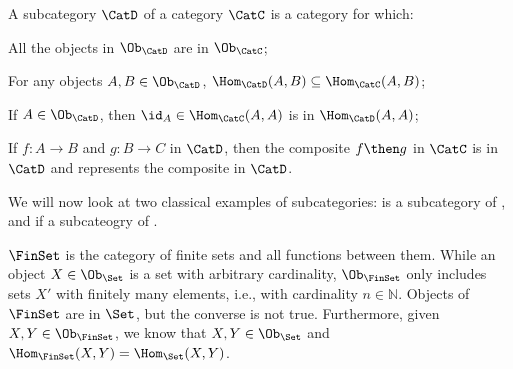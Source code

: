 \begin{ctdefinition}[Subcategory]
\label{def:subcategory}
A subcategory $\CatD$ of a category $\CatC$ is a category for which:
\begin{compactenum}
    \item All the objects in $\Ob_\CatD$ are in $\Ob_\CatC$;
    \item For any objects $A,B\in \Ob_\CatD$, $\Hom_\CatD(A,B)\subseteq \Hom_\CatC(A,B)$;
    \item If $A\in \Ob_\CatD$, then $\id_A\in \Hom_\CatC(A,A)$ is in $\Hom_\CatD(A,A)$;
    \item If $f\colon A\to B$ and $g\colon B\to C$ in $\CatD$, then the composite $f\then g$ in $\CatC$ is in $\CatD$ and represents the composite in $\CatD$.
\end{compactenum}
\end{ctdefinition}

\begin{comment}
\begin{ctdefinition}[Subcategory]
\label{def:subcategory}
	Given a category~$\Cat{C}$, a \emph{subcategory}~$\Cat{B}$ consists of a subcollection of the collection of objects and morphisms of~$\Cat{C}$ such that:
	\begin{enumerate}[(i)]
	\item If a morphism~$f \colon x\to y$ is in $\Cat{B}$, then so are the objects~$x$ and~$y$.
	\item If the morphisms~$f\colon x\to y$ and~$g\colon y\to z$ are in~$\Cat{B}$, then so is their composite~$f\then g\colon x\to z$.
	\item If~$x$ is in~$\Cat{B}$, then so is the identity morphism~$\text{id}_x$.
	\end{enumerate}
\end{ctdefinition} 
\end{comment}


We will now look at two classical examples of subcategories: \FinSet is a subcategory of \Set, and \Set if a subcateogry of \Rel.

\begin{example}
$\FinSet$ is the category of finite sets and all functions between them. While an object $X\in \Ob_\Set$ is a set with arbitrary cardinality, $\Ob_{\FinSet}$ only includes sets $X'$ with finitely many elements, i.e., with cardinality $n\in \mathbb{N}$. Objects of $\FinSet$ are in $\Set$, but the converse is not true. Furthermore, given $X,Y\in \Ob_\FinSet$, we know that $X,Y\in \Ob_\Set$ and $\Hom_{\FinSet}(X,Y)=\Hom_{\Set}(X,Y)$.
\end{example}


